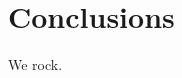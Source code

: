 \documentclass[twoside,a4paper]{article}
\begin{document}
%                                    





%
\section{Conclusions} %
%

We rock.







%
%

\end{document}

